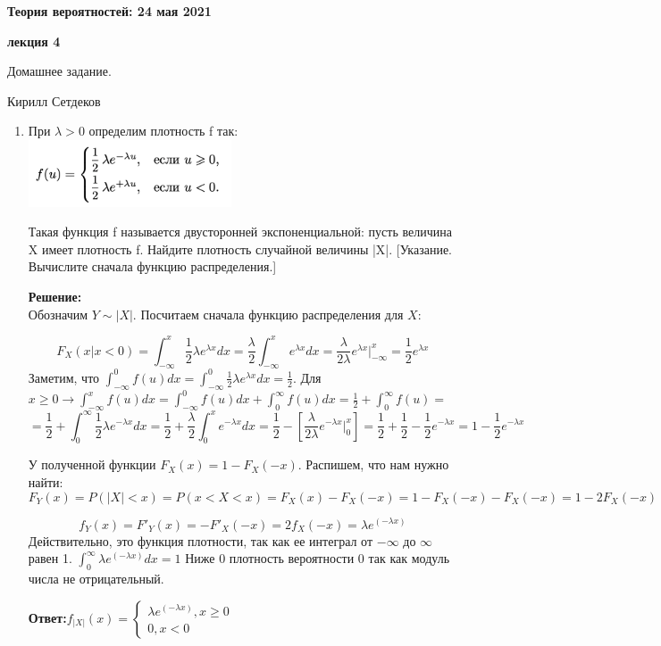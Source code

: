 \documentclass[a4paper,12pt]{article}
\renewcommand{\geq}{\geqslant}
\newcounter{z}
\renewcommand{\date}{{\bf 24 мая 2021}}
\newcommand{\HSEhat}{
\vspace*{-0pt}
\noindent
\setcounter{z}{0}


{\bf \phantom{\date}  \large \hfill Теория вероятностей: \hfill \normalsize \date}

\vspace{5 pt}
{\bf \large \hfill  лекция 4\hfill }

\vspace{15 pt}
\centerline{ \large  Домашнее задание.}
\centerline{ \large  Кирилл Сетдеков}



\vspace*{10pt}
\setcounter{z}{0}

}
\begin{document}
\HSEhat


\begin{enumerate}

\subsection*{Задачи:}


\item	При $\lambda > 0$ определим плотность f так: \\
\includegraphics[width=6cm]{img/task1.png}

Такая функция f называется двусторонней экспоненциальной: пусть величина X имеет плотность f. Найдите плотность случайной величины |X|. [Указание. Вычислите сначала функцию распределения.]

\textbf{Решение:}\\
Обозначим $Y\sim |X|$. Посчитаем сначала функцию распределения для $X$:

$$F_{X}(x|x<0)=\int_{-\infty}^{x} \frac{1}{2}\lambda e^{\lambda x} dx = \frac{\lambda}{2} \int_{-\infty}^{x}  e^{\lambda x} dx=\frac{\lambda}{2\lambda}  e^{\lambda x} \Big|_{-\infty}^{x}=\frac{1}{2}  e^{\lambda x}$$
Заметим, что $\int_{-\infty}^{0} f(u) dx =  \int_{-\infty}^{0} \frac{1}{2}\lambda e^{\lambda x} dx= \frac{1}{2} $. Для $x\geq0 \rightarrow \int_{-\infty}^{x} f(u) dx=\int_{-\infty}^{0} f(u) dx+\int^{\infty}_{0} f(u) dx=\frac{1}{2}+\int^{\infty}_{0} f(u)=$
$$=\frac{1}{2}+\int^{\infty}_{0}\frac{1}{2}\lambda e^{-\lambda x} dx=\frac{1}{2}+\frac{\lambda}{2}\int_{0}^{x}  e^{-\lambda x} dx=\frac{1}{2}-[\frac{\lambda}{2\lambda}  e^{-\lambda x} \Big|_{0}^{x}]=\frac{1}{2}+\frac{1}{2}-\frac{1}{2}  e^{-\lambda x}=1-\frac{1}{2}  e^{-\lambda x}$$

У полученной функции $F_X(x) = 1-F_X(-x)$. Распишем, что нам нужно найти: 
$$F_Y(x)=P(|X| <x) = P(x<X<x) = F_X(x)-F_X(-x)=1-F_X(-x)-F_X(-x)=1-2F_X(-x)$$

$$f_Y(x) = F'_Y(x) = -F'_X(-x)=2f_X(-x) =\lambda e^{(-\lambda x)} $$
Действительно, это функция плотности, так как ее интеграл от $-\infty$ до $\infty$ равен 1. $\int_0^{\infty} {\lambda e^{(-\lambda x)} }dx = 1$
 Ниже 0 плотность вероятности 0 так как модуль числа не отрицательный.


\textbf{Ответ:$f_{|X|}(x)=\begin{cases}\lambda e^{(-\lambda x)}, x\geq0 \\
0, x<0\end{cases}$} 



\end{enumerate}
\end{document}
